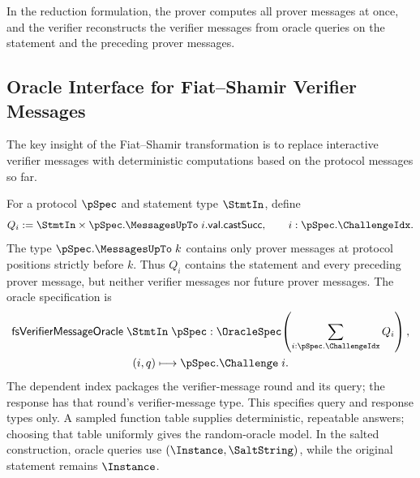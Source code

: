In the reduction formulation, the prover computes all prover messages at once, and the verifier reconstructs the verifier messages from oracle queries on the statement and the preceding prover messages.

\subsection{Oracle Interface for Fiat--Shamir Verifier Messages}\label{sec:fiat_shamir_oracle_interface}

The key insight of the Fiat--Shamir transformation is to replace interactive verifier messages with deterministic computations based on the protocol messages so far.

\begin{definition}
    \label{def:fiat_shamir_spec}
    For a protocol \(\pSpec\) and statement type \(\StmtIn\), define
    \begin{equation*}
      Q_i:=\StmtIn\times\pSpec.\MessagesUpTo\;i.\mathsf{val}.\mathsf{castSucc},
      \qquad i:\pSpec.\ChallengeIdx.
    \end{equation*}
    The type \(\pSpec.\MessagesUpTo\;k\) contains only prover messages at protocol
    positions strictly before \(k\). Thus \(Q_i\) contains the statement and every preceding
    prover message, but neither verifier messages nor future prover messages.
    The oracle specification is
    \begin{equation*}
      \begin{gathered}
        \mathsf{fsVerifierMessageOracle}\;\StmtIn\;\pSpec:
          \OracleSpec\!\left(\sum_{i:\pSpec.\ChallengeIdx}Q_i\right),\\
        (i,q)\longmapsto\pSpec.\Challenge\;i.
      \end{gathered}
    \end{equation*}
    The dependent index packages the verifier-message round and its query; the response
    has that round's verifier-message type. This specifies query and response types only.
    A sampled function table supplies deterministic, repeatable answers; choosing that
    table uniformly gives the random-oracle model. In the salted construction, oracle queries
    use \((\Instance,\SaltString)\), while the original statement remains \(\Instance\).
    \leanok
\end{definition}

